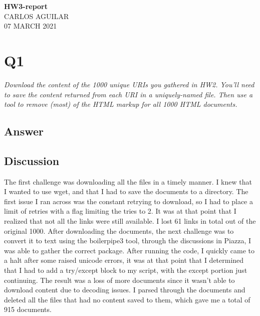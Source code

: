 \documentclass[12pt]{article}
\begin{document}
\begin{centering}
{\large\textbf{HW3-report}}\\ %
CARLOS AGUILAR\\                     %
07 MARCH 2021\\                      %
\end{centering}


\section*{Q1}
\emph{
Download the content of the 1000 unique URIs you gathered in HW2. You'll need to save the content returned from each URI in a uniquely-named file. Then use a tool to remove (most) of the HTML markup for all 1000 HTML documents.}

\subsection*{Answer}





\subsection*{Discussion}
The first challenge was downloading all the files in a timely manner. I knew that I wanted to use wget, and that I had to save the documents to a directory. The first issue I ran across was the constant retrying to download, so I had to place a limit of retries with a flag limiting the tries to 2. It was at that point that I realized that not all the links were still available. I lost 61 links in total out of the original 1000.  After downloading the documents, the next challenge was to convert it to text using the boilerpipe3 tool, through the discussions in Piazza, I was able to gather the correct package. After running the code, I quickly came to a halt after some raised unicode errors, it was at that point that I determined that I had to add a try/except block to my script, with the except portion just continuing. The result was a loss of more documents since it wasn't able to download content due to decoding issues. I parsed through the documents and deleted all the files that had no content saved to them, which gave me a total of 915 documents. 
\end{document}

